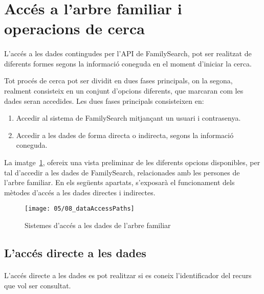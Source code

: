 \section{Accés a l'arbre familiar i operacions de cerca}

    \paragraph{}
    L'accés a les dades contingudes per l'API de FamilySearch, pot ser realitzat de diferents formes segons la informació coneguda en el moment d’iniciar la cerca.

    Tot procés de cerca pot ser dividit en dues fases principals, on la segona, realment consisteix en un conjunt d'opcions diferents, que marcaran com les dades seran accedides. Les dues fases principals consisteixen en:

    \begin{enumerate}
        \item Accedir al sistema de FamilySearch mitjançant un usuari i contrasenya.
        \item Accedir a les dades de forma directa o indirecta, segons la informació coneguda.
    \end{enumerate}

    La imatge~\ref{fig:dataAcessPath}, ofereix una vista preliminar de les diferents opcions disponibles, per tal d'accedir a les dades de FamilySearch, relacionades amb les persones de l'arbre familiar. En els següents apartats, s'exposarà el funcionament dels mètodes d'accés a les dades directes i indirectes.

    \begin{figure}[h]
        \texttt{[image: 05/08\_dataAccessPaths]}
        \centering
        \caption{Sistemes d'accés a les dades de l'arbre familiar}\label{fig:dataAcessPath}
    \end{figure}


    \subsection{L'accés directe a les dades}

        \paragraph{}
        L'accés directe a les dades es pot realitzar si es coneix l'identificador del recurs que vol ser consultat.

